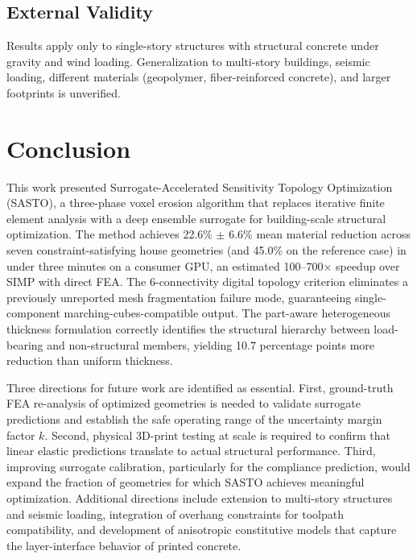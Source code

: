 \documentclass[11pt]{article}
\theoremstyle{plain}
\theoremstyle{definition}
\theoremstyle{remark}
\begin{document}
\subsection{External Validity}

Results apply only to single-story structures with structural concrete under gravity and wind loading. Generalization to multi-story buildings, seismic loading, different materials (geopolymer, fiber-reinforced concrete), and larger footprints is unverified.


\section{Conclusion}
\label{sec:conclusion}

This work presented Surrogate-Accelerated Sensitivity Topology Optimization (SASTO), a three-phase voxel erosion algorithm that replaces iterative finite element analysis with a deep ensemble surrogate for building-scale structural optimization. The method achieves 22.6\% $\pm$ 6.6\% mean material reduction across seven constraint-satisfying house geometries (and 45.0\% on the reference case) in under three minutes on a consumer GPU, an estimated 100--700$\times$ speedup over SIMP with direct FEA. The 6-connectivity digital topology criterion eliminates a previously unreported mesh fragmentation failure mode, guaranteeing single-component marching-cubes-compatible output. The part-aware heterogeneous thickness formulation correctly identifies the structural hierarchy between load-bearing and non-structural members, yielding 10.7 percentage points more reduction than uniform thickness.

Three directions for future work are identified as essential. First, ground-truth FEA re-analysis of optimized geometries is needed to validate surrogate predictions and establish the safe operating range of the uncertainty margin factor $k$. Second, physical 3D-print testing at scale is required to confirm that linear elastic predictions translate to actual structural performance. Third, improving surrogate calibration, particularly for the compliance prediction, would expand the fraction of geometries for which SASTO achieves meaningful optimization. Additional directions include extension to multi-story structures and seismic loading, integration of overhang constraints for toolpath compatibility, and development of anisotropic constitutive models that capture the layer-interface behavior of printed concrete.
\end{document}
